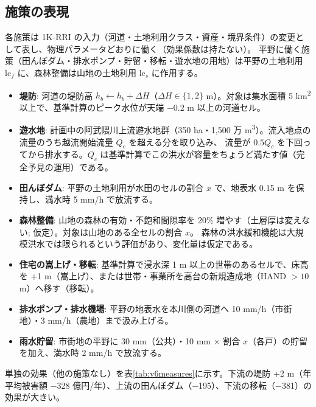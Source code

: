 \documentclass[a4paper,10pt]{ltjsarticle}
\begin{document}
\subsection{施策の表現}
\label{sec:meas-model}
各施策は 1K-RRI の入力（河道・土地利用クラス・資産・境界条件）の変更として表し、物理パラメータどおりに働く（効果係数は持たない）。
平野に働く施策（田んぼダム・排水ポンプ・貯留・移転・遊水地の用地）は平野の土地利用 $\mathrm{lc}_f$ に、森林整備は山地の土地利用 $\mathrm{lc}_s$ に作用する。
\begin{itemize}
  \item \textbf{堤防}: 河道の堤防高 $h_b\leftarrow h_b+\Delta H$（$\Delta H\in\{1,2\}$ m）。対象は集水面積 5 km\textsuperscript{2} 以上で、基準計算のピーク水位が天端 −0.2 m 以上の河道セル。
  \item \textbf{遊水地}: 計画中の阿武隈川上流遊水地群（350 ha・1,500 万 m\textsuperscript{3}\cite{mlit_usuichi}）。流入地点の流量のうち越流開始流量 $Q_c$ を超える分を取り込み、
    流量が $0.5Q_c$ を下回ってから排水する。$Q_c$ は基準計算でこの洪水が容量をちょうど満たす値（完全予見の運用）である。
  \item \textbf{田んぼダム}: 平野の土地利用が水田のセルの割合 $x$ で、地表水 0.15 m を保持し、満水時 5 mm/h で放流する\cite{maff_tanbo}。
  \item \textbf{森林整備}: 山地の森林の有効・不飽和間隙率を 20\% 増やす（土層厚は変えない; 仮定）。対象は山地のある全セルの割合 $x$。
    森林の洪水緩和機能は大規模洪水では限られるという評価\cite{scj2001,kuraji2004}があり、変化量は仮定である。
  \item \textbf{住宅の嵩上げ・移転}: 基準計算で浸水深 1 m 以上の世帯のあるセルで、床高を +1 m（嵩上げ）、または世帯・事業所を高台の新規造成地（HAND $>10$ m）へ移す（移転）。
  \item \textbf{排水ポンプ・排水機場}: 平野の地表水を本川側の河道へ 10 mm/h（市街地）・3 mm/h（農地）まで汲み上げる。
  \item \textbf{雨水貯留}: 市街地の平野に 30 mm（公共）・10 mm × 割合 $x$（各戸）の貯留を加え、満水時 2 mm/h で放流する。
\end{itemize}
単独の効果（他の施策なし）を表\ref{tab:v6measures}に示す。下流の堤防 +2 m（年平均被害額 −328 億円/年）、上流の田んぼダム（−195）、下流の移転（−381）の効果が大きい。


\end{document}
